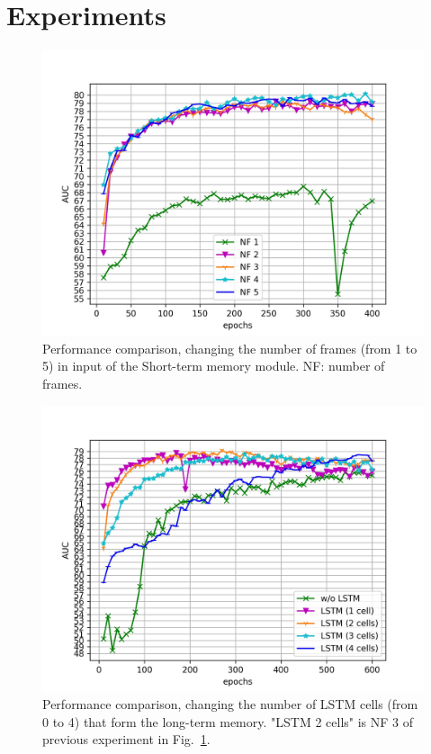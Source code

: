 \section{Experiments}
\label{sec:experiments}

\begin{figure}[t]
\centering
	\includegraphics[trim=0 0 0 0, clip, width=1.\linewidth]{images/exp_1.jpg}
	\caption{Performance comparison, changing the number of frames (from 1 to 5) in input of the Short-term memory module. NF: number of frames.  }
	\label{fig:num-frames-vst}
\end{figure}

\begin{figure}[t]
\centering
	\includegraphics[trim=0 0 0 0, clip, width=1.\linewidth]{images/exp_2.jpg}
	\caption{Performance comparison, changing the number of LSTM cells (from 0 to 4) that form the long-term memory. "LSTM 2 cells" is NF 3 of previous experiment in Fig.~\ref{fig:num-frames-vst}.}
	\label{fig:num-memory-cells}
\end{figure}

